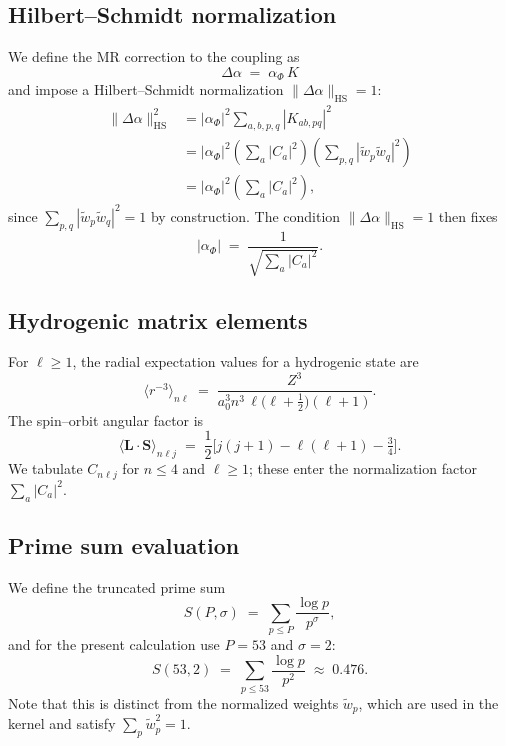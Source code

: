 \documentclass[11pt,a4paper]{article}
\begin{document}
\subsection{Hilbert--Schmidt normalization}
We define the MR correction to the coupling as
\begin{equation}
  \Delta\alpha \;=\; \alpha_\Phi \, K
\end{equation}
and impose a Hilbert--Schmidt normalization
$\|\Delta\alpha\|_{\mathrm{HS}} = 1$:
\begin{align}
  \|\Delta\alpha\|_{\mathrm{HS}}^2
  &= |\alpha_\Phi|^2 \sum_{a,b,p,q} |K_{ab,pq}|^2 \\
  &= |\alpha_\Phi|^2 \left(\sum_a |C_a|^2\right)
                      \left(\sum_{p,q} |\tilde{w}_p \tilde{w}_q|^2\right) \\
  &= |\alpha_\Phi|^2 \left(\sum_a |C_a|^2\right),
\end{align}
since $\sum_{p,q} |\tilde{w}_p \tilde{w}_q|^2 = 1$ by construction.
The condition $\|\Delta\alpha\|_{\mathrm{HS}}=1$ then fixes
\begin{equation}
  |\alpha_\Phi| \;=\; \frac{1}{\sqrt{\sum_a |C_a|^2}}.
\end{equation}

\subsection{Hydrogenic matrix elements}
For $\ell \ge 1$, the radial expectation values for a hydrogenic state
are
\begin{equation}
  \big\langle r^{-3} \big\rangle_{n\ell}
  \;=\;
  \frac{Z^3}{a_0^3 n^3 \,\ell\bigl(\ell+\tfrac{1}{2}\bigr)(\ell+1)}.
\end{equation}
The spin--orbit angular factor is
\begin{equation}
  \big\langle \mathbf{L}\cdot\mathbf{S} \big\rangle_{n\ell j}
  \;=\;
  \frac{1}{2}\bigl[j(j+1) - \ell(\ell+1) - \tfrac{3}{4}\bigr].
\end{equation}
We tabulate $C_{n\ell j}$ for $n\le 4$ and $\ell\ge 1$; these enter the
normalization factor $\sum_a |C_a|^2$.

\subsection{Prime sum evaluation}
We define the truncated prime sum
\begin{equation}
  S(P,\sigma) \;=\; \sum_{p \le P} \frac{\log p}{p^\sigma},
\end{equation}
and for the present calculation use $P=53$ and $\sigma=2$:
\begin{equation}
  S(53,2) \;=\; \sum_{p\le 53} \frac{\log p}{p^2}
  \;\approx\; 0.476.
\end{equation}
Note that this is distinct from the normalized weights $\tilde{w}_p$,
which are used in the kernel and satisfy $\sum_p \tilde{w}_p^2 = 1$.
\end{document}
